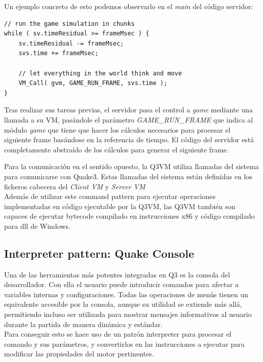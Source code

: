 \documentclass[a4paper,12pt]{report}
\begin{document}
	Un ejemplo concreto de esto podemos observarlo en el \textit{main} del código servidor:
	
		\begin{lstlisting}[style=C, numbers=none]
// run the game simulation in chunks
while ( sv.timeResidual >= frameMsec ) {
	sv.timeResidual -= frameMsec;
	svs.time += frameMsec;
	
	// let everything in the world think and move
	VM_Call( gvm, GAME_RUN_FRAME, svs.time );
}
	\end{lstlisting}
	
	Tras realizar sus tareas previas, el servidor pasa el control a \textit{game} mediante una llamada a su VM, pasándole el parámetro \textit{GAME\_RUN\_FRAME} que indica al módulo \textit{game} que tiene que hacer los cálculos necesarios para procesar el siguiente frame basándose en la referencia de tiempo. El código del servidor está completamente abstraído de los cálculos para generar el siguiente frame.\\
	 \cite{q3vmcallex}

	Para la comunicación en el sentido opuesto, la Q3VM utiliza llamadas del sistema para comunicarse con Quake3. Estas llamadas del sistema están definidas en los ficheros cabecera del \textit{Client VM}\cite{q3vmclient} y \textit{Server VM}\cite{q3vmserver}\\
	
	
	Además de utilizar este command pattern para ejecutar operaciones implementadas en código ejecutable por la Q3VM, las Q3VM también son capaces de ejecutar bytecode compilado en instrucciones x86 y código compilado para dll de Windows. \cite{q3vmbb}
	
	
		\subsection{Interpreter pattern: Quake Console}
	Una de las herramientas más potentes integradas en Q3 es la consola del desarrollador. Con ella el usuario puede introducir comandos para afectar a variables internas y configuraciones. Todas las operaciones de menús tienen un equivalente accesible por la consola, aunque su utilidad se extiende más allá, permitiendo incluso ser utilizada para mostrar mensajes informativos al usuario durante la partida de manera dinámica y estándar.\\
	
	Para conseguir esto se hace uso de un patrón interpreter para procesar el comando y sus parámetros, y convertirlos en las instrucciones a ejecutar para modificar las propiedades del motor pertinentes.\cite{console_source}\cite{consolecmd_source}\\
	
\end{document}
